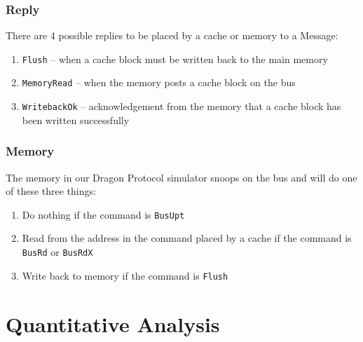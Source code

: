 \documentclass[nonacm,acmsmall,screen,11pt]{acmart}
\begin{document}
\subsubsection{Reply}
There are 4 possible replies to be placed by a cache or memory to a Message:
\begin{enumerate}
  \item \texttt{Flush} -- when a cache block must be written back to the main memory
  \item \texttt{MemoryRead} -- when the memory posts a cache block on the bus
  \item \texttt{WritebackOk} -- acknowledgement from the memory that a cache block has been written successfully
\end{enumerate}

\subsubsection{Memory}
The memory in our Dragon Protocol simulator snoops on the bus and will do one of these three things:
\begin{enumerate}
  \item Do nothing if the command is \texttt{BusUpt}
  \item Read from the address in the command placed by a cache if the command is \texttt{BusRd} or \texttt{BusRdX}
  \item Write back to memory if the command is \texttt{Flush}
\end{enumerate}

\clearpage
\section{Quantitative Analysis}
\end{document}
